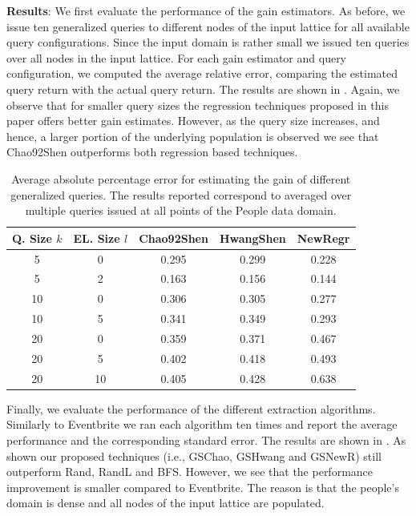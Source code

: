 \documentclass{vldb}
\begin{document}
\noindent\textbf{Results}: We first evaluate the performance of the gain estimators. As before, we issue ten generalized queries to different nodes of the input lattice for all available query configurations. Since the input domain is rather small we issued ten queries over all nodes in the input lattice. For each gain estimator and query configuration, we computed the average relative error, comparing the estimated query return with the actual query return. The results are shown in . Again, we observe that for smaller query sizes the regression techniques proposed in this paper offers better gain estimates. However, as the query size increases, and hence, a larger portion of the underlying population is observed we see that Chao92Shen outperforms both regression based techniques. 

\begin{table}
\small\center
\caption{Average absolute percentage error for estimating the gain of different generalized queries. The results reported correspond to  averaged over multiple queries issued at all points of the People data domain.}
\label{tab:peopleesterror}
\begin{tabular}{|c|c|c|c|c|}
\hline
\textbf{Q. Size $k$} & \textbf{EL. Size $l$} & \textbf{Chao92Shen} & \textbf{HwangShen} & \textbf{NewRegr} \\ \hline
5 & 0 & 0.295 & 0.299 & 0.228\\
5 & 2 & 0.163 &  0.156 & 0.144\\
10 & 0 &  0.306 & 0.305 & 0.277\\
10 & 5 &  0.341 & 0.349 & 0.293\\
20 & 0 &  0.359& 0.371 & 0.467 \\
20 & 5 &  0.402 & 0.418 & 0.493\\
20 & 10 & 0.405 & 0.428 & 0.638\\
\hline
\end{tabular}
\vspace{-10pt}
\end{table}

Finally, we evaluate the performance of the different extraction algorithms. Similarly to Eventbrite we ran each algorithm ten times and report the average performance and the corresponding standard error. The results are shown in . As shown our proposed techniques (i.e., GSChao, GSHwang and GSNewR) still outperform Rand, RandL and BFS. However, we see that the performance improvement is smaller compared to Eventbrite. The reason is that the people's domain is dense and all nodes of the input lattice are populated. 
\end{document}
